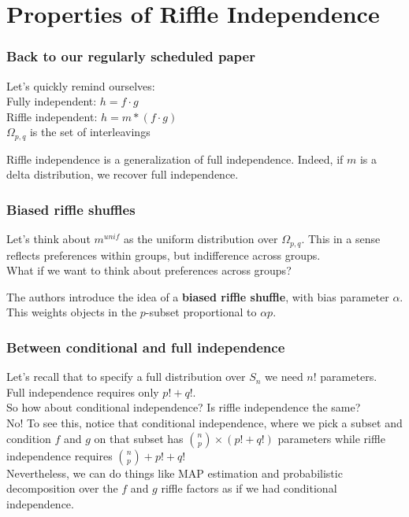 \documentclass{beamer} %
\theoremstyle{definition} %
\def \pausenl {\pause $ \ $\\}
\begin{document}
		
\section{Properties of Riffle Independence}

\begin{frame}
	\frametitle{Back to our regularly scheduled paper}
	
	Let's quickly remind ourselves:\\
	
	\pausenl
	
	Fully independent: $h = f \cdot g$\\
	
	Riffle independent: $h = m \ast (f\cdot g)$\\
	$\Omega_{p,q}$ is the set of interleavings
	
	\pausenl
	Riffle independence is a generalization of full independence.  Indeed, if $m$ is a delta distribution, we recover full independence.
	
\end{frame}

\begin{frame}
	\frametitle{Biased riffle shuffles}
	
	Let's think about $m^{unif}$ as the uniform distribution over $\Omega_{p,q}$.  This in a sense reflects preferences within groups, but indifference across groups.\\
	
	\pausenl
	
	What if we want to think about preferences \textup{across} groups?
	
	\pausenl
	
	The authors introduce the idea of a \textbf{biased riffle shuffle}, with bias parameter $\alpha$.\\\pause
	This weights objects in the $p$-subset proportional to $\alpha p$.
\end{frame}


\begin{frame}
	\frametitle{Between conditional and full independence}
	
	Let's recall that to specify a full distribution over $S_n$ we need $n!$ parameters.\\
	\pausenl
	Full independence requires only $p! + q!$.\\
	\pausenl
	So how about conditional independence?  Is riffle independence the same?\\
	\pausenl
	No!  To see this, notice that conditional independence, where we pick a subset and condition $f$ and $g$ on that subset has $\binom{n}{p} \times (p! + q!)$ parameters while riffle independence requires $\binom{n}{p} + p! + q!$\\
	\pausenl
	
	Nevertheless, we can do things like MAP estimation and probabilistic decomposition over the $f$ and $g$ riffle factors as if we had conditional independence.
\end{frame}
\end{document}

